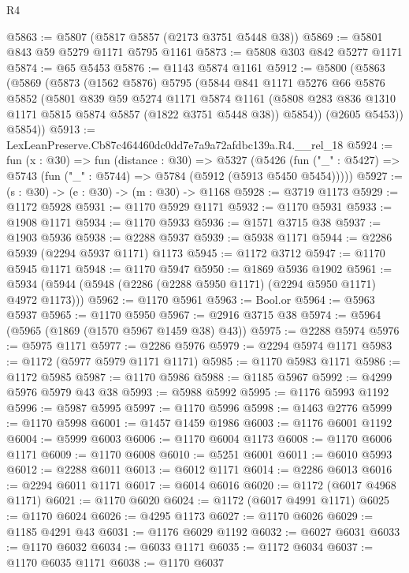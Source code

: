 \begin{lexlean}{R4}
\begin{coremodule}
@5863 := @5807 (@5817 @5857 (@2173 @3751 @5448 @38))
@5869 := @5801 @843 @59 @5279 @1171 @5795 @1161
@5873 := @5808 @303 @842 @5277 @1171
@5874 := @65 @5453
@5876 := @1143 @5874 @1161
@5912 := @5800
    (@5863
      (@5869
        (@5873
          (@1562 @5876)
          @5795
          (@5844
            @841
            @1171
            @5276
            @66
            @5876
            @5852
            (@5801
              @839
              @59
              @5274
              @1171
              @5874
              @1161
              (@5808 @283 @836 @1310 @1171 @5815 @5874 @5857 (@1822 @3751 @5448 @38))
              @5854))
          (@2605 @5453))
        @5854))
@5913 := LexLeanPreserve.Cb87c464460dc0dd7e7a9a72afdbc139a.R4.__rel_18
@5924 := fun (x : @30) =>
  fun (distance : @30) =>
  @5327
    (@5426 (fun ("_" : @5427) => @5743 (fun ("_" : @5744) => @5784 (@5912 (@5913 @5450 @5454)))))
@5927 := (s : @30) -> (e : @30) -> (m : @30) -> @1168
@5928 := @3719 @1173
@5929 := @1172 @5928
@5931 := @1170 @5929 @1171
@5932 := @1170 @5931
@5933 := @1908 @1171
@5934 := @1170 @5933
@5936 := @1571 @3715 @38
@5937 := @1903 @5936
@5938 := @2288 @5937
@5939 := @5938 @1171
@5944 := @2286 @5939 (@2294 @5937 @1171) @1173
@5945 := @1172 @3712
@5947 := @1170 @5945 @1171
@5948 := @1170 @5947
@5950 := @1869 @5936 @1902
@5961 := @5934 (@5944 (@5948 (@2286 (@2288 @5950 @1171) (@2294 @5950 @1171) @4972 @1173)))
@5962 := @1170 @5961
@5963 := Bool.or
@5964 := @5963 @5937
@5965 := @1170 @5950
@5967 := @2916 @3715 @38
@5974 := @5964 (@5965 (@1869 (@1570 @5967 @1459 @38) @43))
@5975 := @2288 @5974
@5976 := @5975 @1171
@5977 := @2286 @5976
@5979 := @2294 @5974 @1171
@5983 := @1172 (@5977 @5979 @1171 @1171)
@5985 := @1170 @5983 @1171
@5986 := @1172 @5985
@5987 := @1170 @5986
@5988 := @1185 @5967
@5992 := @4299 @5976 @5979 @43 @38
@5993 := @5988 @5992
@5995 := @1176 @5993 @1192
@5996 := @5987 @5995
@5997 := @1170 @5996
@5998 := @1463 @2776
@5999 := @1170 @5998
@6001 := @1457 @1459 @1986
@6003 := @1176 @6001 @1192
@6004 := @5999 @6003
@6006 := @1170 @6004 @1173
@6008 := @1170 @6006 @1171
@6009 := @1170 @6008
@6010 := @5251 @6001
@6011 := @6010 @5993
@6012 := @2288 @6011
@6013 := @6012 @1171
@6014 := @2286 @6013
@6016 := @2294 @6011 @1171
@6017 := @6014 @6016
@6020 := @1172 (@6017 @4968 @1171)
@6021 := @1170 @6020
@6024 := @1172 (@6017 @4991 @1171)
@6025 := @1170 @6024
@6026 := @4295 @1173
@6027 := @1170 @6026
@6029 := @1185 @4291 @43
@6031 := @1176 @6029 @1192
@6032 := @6027 @6031
@6033 := @1170 @6032
@6034 := @6033 @1171
@6035 := @1172 @6034
@6037 := @1170 @6035 @1171
@6038 := @1170 @6037

\end{coremodule}
\end{lexlean}
